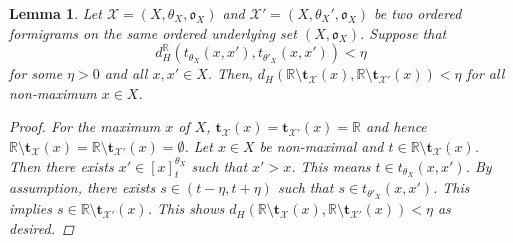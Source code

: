 \documentclass[a4paper,12pt]{article}
\newtheorem{lemma}{Lemma}[section]
\begin{document}
\begin{lemma} Let $\mathcal{X}=(X,\theta_X,\mathfrak{o}_X)$ and $\mathcal{X}'=(X,\theta_X', \mathfrak{o}_X)$ be two ordered formigrams on the same ordered underlying set $(X,\mathfrak{o}_X)$. Suppose that
$$d_H^\mathbb{R}(t_{\theta_X}(x,x'), t_{\theta'_X}(x,x'))< \eta$$
for some $ \eta>0$ and all $x,x'\in X$. Then, $d_H(\mathbb{R}\setminus \mathbf{t}_{\mathcal{X}}(x),\mathbb{R}\setminus \mathbf{t}_{\mathcal{X}'}(x))<\eta$ for all non-maximum $x\in X$.
\begin{proof}
For the maximum $x$ of $X$, $\mathbf{t}_{\mathcal{X}}(x)=\mathbf{t}_{\mathcal{X}'}(x)=\mathbb{R}$ and hence $\mathbb{R}\setminus \mathbf{t}_{\mathcal{X}}(x)=\mathbb{R}\setminus \mathbf{t}_{\mathcal{X}'}(x)=\emptyset$. Let $x\in X$ be non-maximal and $t\in \mathbb{R}\setminus \mathbf{t}_{\mathcal{X}}(x)$. Then there exists $x'\in [x]_{t}^{\theta_X}$ such that $x'>x$. This means $t\in t_{\theta_X}(x,x')$. By assumption, there exists $s\in (t-\eta, t+\eta)$ such that $s\in t_{\theta'_X}(x,x')$. This implies $s\in \mathbb{R}\setminus \mathbf{t}_{\mathcal{X}'}(x)$. This shows $d_H(\mathbb{R}\setminus \mathbf{t}_{\mathcal{X}}(x),\mathbb{R}\setminus \mathbf{t}_{\mathcal{X}'}(x))<\eta$ as desired.
\end{proof}
\end{lemma}
\end{document}
